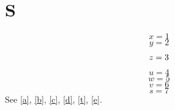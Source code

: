 \documentclass{article}
\begin{document}
\section{S}
\begin{equation}\label{a} x=1 \end{equation}
\begin{equation}\label{b}\nonumber y=2 \end{equation}
\begin{equation}\notag\label{c} z=3 \end{equation}
\begin{equation} u=4 \nonumber\end{equation}
\begin{equation}\label{d} w=5 \end{equation}
\begin{equation}\tag{X}\nonumber\label{t} v=6 \end{equation}
\begin{equation}\label{e} s=7 \end{equation}
See \ref{a}, \ref{b}, \ref{c}, \ref{d}, \ref{t}, \ref{e}.
\end{document}
